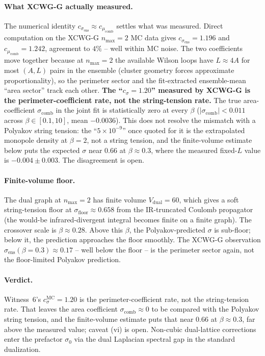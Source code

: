 \documentclass[11pt]{article}
\begin{document}
\paragraph{What XCWG-G actually measured.} The numerical identity
$c_{\sigma_\text{ens}}\approx c_{\mu_\text{comb}}$ settles what was measured. Direct
computation on the XCWG-G $n_\text{max}=2$ MC data gives $c_{\sigma_\text{ens}}=1.196$
and $c_{\mu_\text{comb}}=1.242$, agreement to $4\%$ -- well within MC noise.
The two coefficients move together because at $n_\text{max}=2$ the available
Wilson loops have $L\approx 4A$ for most $(A,L)$ pairs in the ensemble (cluster
geometry forces approximate proportionality), so the perimeter sector and the
fit-extracted ensemble-mean ``area sector'' track each other. \textbf{The
``$c_\sigma=1.20$'' measured by XCWG-G is the perimeter-coefficient rate, not
the string-tension rate.} The true area-coefficient $\sigma_\text{comb}$ in
the joint fit is statistically zero at every $\beta$ ($|\sigma_\text{comb}|<0.011$
across $\beta\in[0.1,10]$, mean $-0.0036$).  This does not resolve the
mismatch with a Polyakov string tension: the ``$5\times 10^{-9}$'' once
quoted for it is the extrapolated monopole density at $\beta = 2$, not a
string tension, and the finite-volume estimate below puts the expected
$\sigma$ near $0.66$ at $\beta \approx 0.3$, where the measured fixed-$L$
value is $-0.004 \pm 0.003$.  The disagreement is open.

\paragraph{Finite-volume floor.} The dual graph at $n_\text{max}=2$ has finite
volume $V_\text{dual}=60$, which gives a soft string-tension floor at
$\sigma_\text{floor}\approx 0.658$ from the IR-truncated Coulomb propagator
(the would-be infrared-divergent integral becomes finite on a finite graph).
The crossover scale is $\beta\approx 0.28$. Above this $\beta$, the
Polyakov-predicted $\sigma$ is sub-floor; below it, the prediction approaches
the floor smoothly. The XCWG-G observation $\sigma_\text{ens}(\beta=0.3)\approx
0.17$ -- well below the floor -- is the perimeter sector again, not the
floor-limited Polyakov prediction.

\paragraph{Verdict.} Witness~6's $c_\sigma^\text{MC} = 1.20$ is the
perimeter-coefficient rate, not the string-tension rate.  That leaves the
area coefficient $\sigma_\text{comb}\approx 0$ to be compared with the
Polyakov string tension, and the finite-volume estimate puts that near $0.66$
at $\beta\approx 0.3$, far above the measured value; caveat (vi) is open.
Non-cubic dual-lattice corrections enter the prefactor $\sigma_0$ via the
dual Laplacian spectral gap in the standard dualization.
\end{document}
